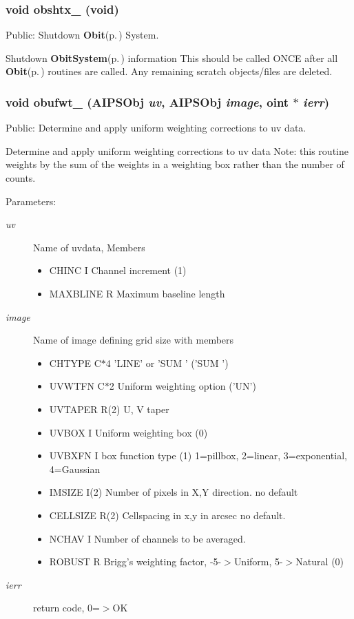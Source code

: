 \subsubsection{\setlength{\rightskip}{0pt plus 5cm}void obshtx\_\- (void)}\label{ObitAIPSFortran_8c_a5}


Public: Shutdown {\bf Obit}{\rm (p.\,\pageref{structObit})} System. 

Shutdown {\bf Obit\-System}{\rm (p.\,\pageref{structObitSystem})} information This should be called ONCE after all {\bf Obit}{\rm (p.\,\pageref{structObit})} routines are called. Any remaining scratch objects/files are deleted. 
\subsubsection{\setlength{\rightskip}{0pt plus 5cm}void obufwt\_\- ({\bf AIPSObj} {\em uv}, {\bf AIPSObj} {\em image}, {\bf oint} $\ast$ {\em ierr})}\label{ObitAIPSFortran_8c_a7}


Public: Determine and apply uniform weighting corrections to uv data. 

Determine and apply uniform weighting corrections to uv data Note: this routine weights by the sum of the weights in a weighting box rather than the number of counts. \begin{Desc}
\item[Parameters:]
\begin{description}
\item[{\em uv}]Name of uvdata, Members \begin{itemize}
\item CHINC I Channel increment (1) \item MAXBLINE R Maximum baseline length \end{itemize}
\item[{\em image}]Name of image defining grid size with members \begin{itemize}
\item CHTYPE C$\ast$4 'LINE' or 'SUM ' ('SUM ') \item UVWTFN C$\ast$2 Uniform weighting option ('UN') \item UVTAPER R(2) U, V taper \item UVBOX I Uniform weighting box (0) \item UVBXFN I box function type (1) 1=pillbox, 2=linear, 3=exponential, 4=Gaussian \item IMSIZE I(2) Number of pixels in X,Y direction. no default \item CELLSIZE R(2) Cellspacing in x,y in arcsec no default. \item NCHAV I Number of channels to be averaged. \item ROBUST R Brigg's weighting factor, -5-$>$Uniform, 5-$>$Natural (0) \end{itemize}
\item[{\em ierr}]return code, 0=$>$OK \end{description}
\end{Desc}
